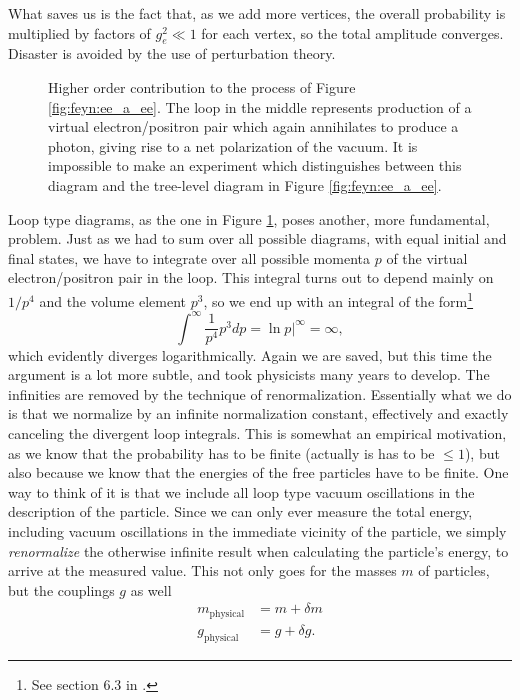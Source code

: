 What saves us is the fact that, as we add more vertices, the overall probability is multiplied by factors of $g_e^2 \ll 1$ for each vertex, so the total amplitude converges. Disaster is avoided by the use of perturbation theory.
\begin{figure}[htp]
\centering
	
\caption{Higher order contribution to the process of Figure \ref{fig:feyn:ee_a_ee}. The loop in the middle represents production of a virtual electron/positron pair which again annihilates to produce a photon, giving rise to a net polarization of the vacuum. It is impossible to make an experiment which distinguishes between this diagram and the tree-level diagram in Figure \ref{fig:feyn:ee_a_ee}.} \label{fig:feyn:ee_a_ee_2}
\end{figure}
Loop type diagrams, as the one in Figure \ref{fig:feyn:ee_a_ee_2}, poses another, more fundamental, problem. Just as we had to sum over all possible diagrams, with equal initial and final states, we have to integrate over all possible momenta $p$ of the virtual electron/positron pair in the loop. This integral turns out to depend mainly on $1 / p^4$ and the volume element $p^3$, so we end up with an integral of the form\footnote{See section 6.3 in \cite{griffiths1987iep}.}
\begin{equation}
	\int^\infty \frac{1}{p^4}p^3 dp = \ln{p}|^\infty = \infty,
\end{equation}
which evidently diverges logarithmically. Again we are saved, but this time the argument is a lot more subtle, and took physicists many years to develop. The infinities are removed by the technique of renormalization. Essentially what we do is that we normalize by an infinite normalization constant, effectively and exactly canceling the divergent loop integrals. This is somewhat an empirical motivation, as we know that the probability has to be finite (actually is has to be $\leq 1$), but also because we know that the energies of the free particles have to be finite. One way to think of it is that we include all loop type vacuum oscillations in the description of the particle. Since we can only ever measure the total energy, including vacuum oscillations in the immediate vicinity of the particle, we simply \emph{renormalize} the otherwise infinite result when calculating the particle's energy, to arrive at the measured value. This not only goes for the masses $m$ of particles, but the couplings $g$ as well \cite{griffiths1987iep}
\begin{align}
	m_{\textrm{physical}} &= m + \delta m \nonumber \\
	g_{\textrm{physical}} &= g + \delta g.
\end{align}
